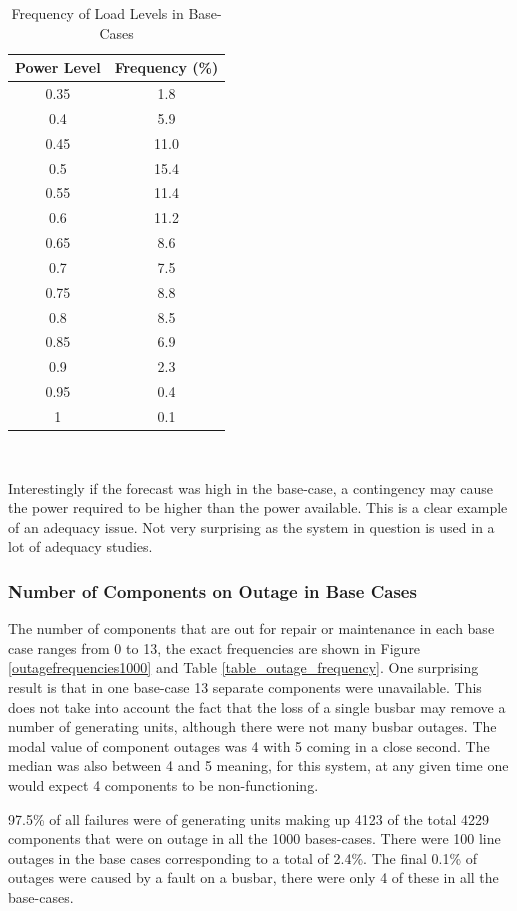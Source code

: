 \documentclass[a4paper,oneside,12pt]{report}
\begin{document}
\begin{table}[htbp]
\caption{Frequency of Load Levels in Base-Cases}
\label{table_load_levels}
\centering
\begin{tabular}{c||c}
\bfseries Power Level & \bfseries Frequency (\%) \\
\hline \hline
0.35 & 1.8 \\ 
0.4 & 5.9 \\ 
0.45 & 11.0 \\ 
0.5 & 15.4 \\ 
0.55 & 11.4 \\ 
0.6 & 11.2 \\ 
0.65 & 8.6 \\ 
0.7 & 7.5 \\ 
0.75 & 8.8 \\ 
0.8 & 8.5 \\ 
0.85 & 6.9 \\ 
0.9 & 2.3 \\ 
0.95 & 0.4 \\ 
1 & 0.1 \\ 
\hline
\end{tabular}\\
\end{table}

Interestingly if the forecast was high in the base-case, a contingency may cause the power required to be higher than the power available. This is a clear example of an adequacy issue. Not very surprising as the system in question is used in a lot of adequacy studies.

\subsubsection{Number of Components on Outage in Base Cases}

The number of components that are out for repair or maintenance in each base case ranges from 0 to 13, the exact frequencies are shown in Figure \ref{outagefrequencies1000} and Table \ref{table_outage_frequency}. One surprising result is that in one base-case 13 separate components were unavailable. This does not take into account the fact that the loss of a single busbar may remove a number of generating units, although there were not many busbar outages. The modal value of component outages was 4 with 5 coming in a close second. The median was also between 4 and 5 meaning, for this system, at any given time one would expect 4 components to be non-functioning.

97.5\% of all failures were of generating units making up 4123 of the total 4229 components that were on outage in all the 1000 bases-cases. There were 100 line outages in the base cases corresponding to a total of 2.4\%. The final 0.1\% of outages were caused by a fault on a busbar, there were only 4 of these in all the base-cases.
\end{document}

